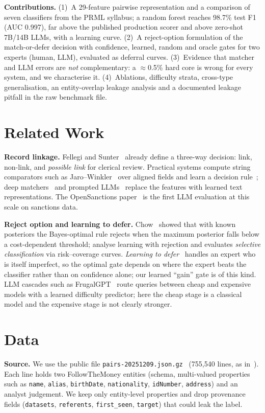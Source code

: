 \documentclass[conference]{IEEEtran}
\begin{document}
\textbf{Contributions.} (1)~A 29-feature pairwise representation and a comparison of seven classifiers from the PRML syllabus; a random forest reaches 98.7\% test F1 (AUC 0.997), far above the published production scorer and above zero-shot 7B/14B LLMs, with a learning curve. (2)~A reject-option formulation of the match-or-defer decision with confidence, learned, random and oracle gates for two experts (human, LLM), evaluated as deferral curves. (3)~Evidence that matcher and LLM errors are \emph{not} complementary: a $\approx$0.5\% hard core is wrong for every system, and we characterise it. (4)~Ablations, difficulty strata, cross-type generalisation, an entity-overlap leakage analysis and a documented leakage pitfall in the raw benchmark file.

\section{Related Work}
\textbf{Record linkage.} Fellegi and Sunter~\cite{fellegi1969} already define a three-way decision: link, non-link, and \emph{possible link} for clerical review. Practical systems compute string comparators such as Jaro--Winkler~\cite{winkler1990} over aligned fields and learn a decision rule~\cite{christen2012}; deep matchers~\cite{mudgal2018deepmatcher,li2020ditto} and prompted LLMs~\cite{narayan2022wrangle,peeters2025llm} replace the features with learned text representations. The OpenSanctions paper~\cite{smith2026opensanctions} is the first LLM evaluation at this scale on sanctions data.

\textbf{Reject option and learning to defer.} Chow~\cite{chow1970} showed that with known posteriors the Bayes-optimal rule rejects when the maximum posterior falls below a cost-dependent threshold; \cite{herbei2006,cortes2016rejection} analyse learning with rejection and \cite{geifman2017selective} evaluates \emph{selective classification} via risk--coverage curves. \emph{Learning to defer}~\cite{mozannar2020defer} handles an expert who is itself imperfect, so the optimal gate depends on where the expert beats the classifier rather than on confidence alone; our learned ``gain'' gate is of this kind. LLM cascades such as FrugalGPT~\cite{chen2023frugalgpt} route queries between cheap and expensive models with a learned difficulty predictor; here the cheap stage is a classical model and the expensive stage is not clearly stronger.

\section{Data}
\label{sec:data}
\textbf{Source.} We use the public file \texttt{pairs-20251209.json.gz}~\cite{opensanctions_pairs_docs} (755{,}540 lines, as in~\cite{smith2026opensanctions}). Each line holds two FollowTheMoney entities (schema, multi-valued properties such as \texttt{name}, \texttt{alias}, \texttt{birthDate}, \texttt{nationality}, \texttt{idNumber}, \texttt{address}) and an analyst judgement. We keep only entity-level properties and drop provenance fields (\texttt{datasets}, \texttt{referents}, \texttt{first\_seen}, \texttt{target}) that could leak the label.
\end{document}
